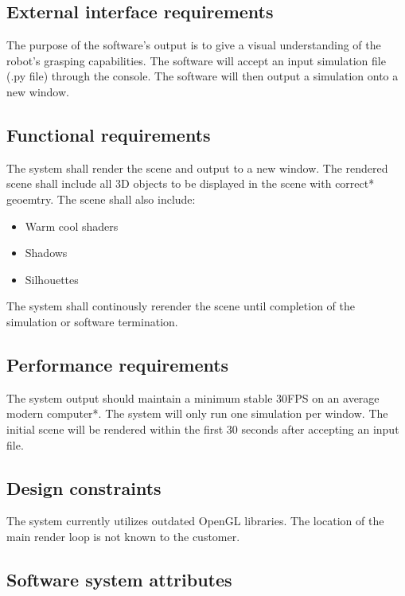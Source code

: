\documentclass[10pt,journal,compsoc]{IEEEtran}
\begin{document}
\subsection{External interface requirements}
\vspace{3mm}
The purpose of the software's output is to give a visual understanding of the robot's grasping capabilities.
The software will accept an input simulation file (.py file) through the console.
The software will then output a simulation onto a new window.

\vfill

\subsection{Functional requirements}
\vspace{3mm}
The system shall render the scene and output to a new window.
The rendered scene shall include all 3D objects to be displayed in the scene with correct* geoemtry.
The scene shall also include:
\begin{itemize}
\item Warm cool shaders
\item Shadows
\item Silhouettes
\end{itemize}
The system shall continously rerender the scene until completion of the simulation or software termination.

\vfill

\subsection{Performance requirements}
\vspace{3mm}
The system output should maintain a minimum stable 30FPS on an average modern computer*.
The system will only run one simulation per window.
The initial scene will be rendered within the first 30 seconds after accepting an input file.

\vfill

\subsection{Design constraints}
\vspace{3mm}
The system currently utilizes outdated OpenGL libraries.
The location of the main render loop is not known to the customer.

\vfill

\subsection{Software system attributes}
\vspace{3mm}
\end{document}
